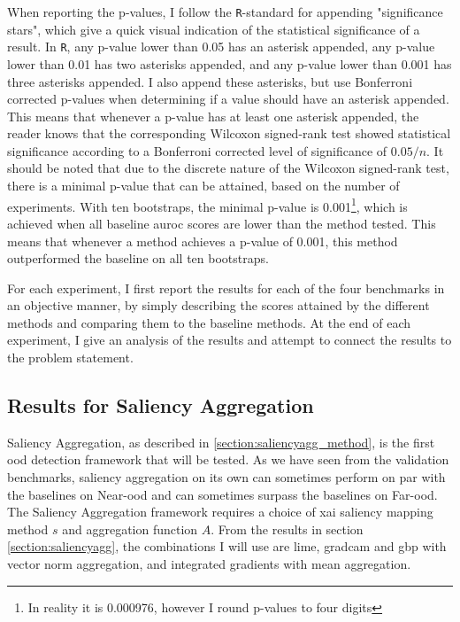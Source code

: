 \documentclass[UKenglish]{uiomasterthesis} %
\theoremstyle{definition}
\begin{document}
When reporting the p-values, I follow the \texttt{R}-standard for appending "significance stars", which give a quick visual indication of the statistical significance of a result. In \texttt{R}, any p-value lower than 0.05 has an asterisk appended, any p-value lower than 0.01 has two asterisks appended, and any p-value lower than 0.001 has three asterisks appended. I also append these asterisks, but use Bonferroni corrected p-values when determining if a value should have an asterisk appended. This means that whenever a p-value has at least one asterisk appended, the reader knows that the corresponding Wilcoxon signed-rank test showed statistical significance according to a Bonferroni corrected level of significance of $0.05 / n$. It should be noted that due to the discrete nature of the Wilcoxon signed-rank test, there is a minimal p-value that can be attained, based on the number of experiments. With ten bootstraps, the minimal p-value is 0.001\footnote{In reality it is 0.000976, however I round p-values to four digits}, which is achieved when all baseline \ac{auroc} scores are lower than the method tested. This means that whenever a method achieves a p-value of 0.001, this method outperformed the baseline on all ten bootstraps.

For each experiment, I first report the results for each of the four benchmarks in an objective manner, by simply describing the scores attained by the different methods and comparing them to the baseline methods. At the end of each experiment, I give an analysis of the results and attempt to connect the results to the problem statement.

\subsection{Results for Saliency Aggregation} \label{section:salagg_results}

Saliency Aggregation, as described in \ref{section:saliencyagg_method}, is the first \ac{ood} detection framework that will be tested. As we have seen from the validation benchmarks, saliency aggregation on its own can sometimes perform on par with the baselines on Near-\ac{ood} and can sometimes surpass the baselines on Far-\ac{ood}. The Saliency Aggregation framework requires a choice of \ac{xai} saliency mapping method $s$ and aggregation function $A$. From the results in section \ref{section:saliencyagg}, the combinations I will use are \ac{lime}, \ac{gradcam} and \ac{gbp} with vector norm aggregation, and integrated gradients with mean aggregation.
\end{document}
